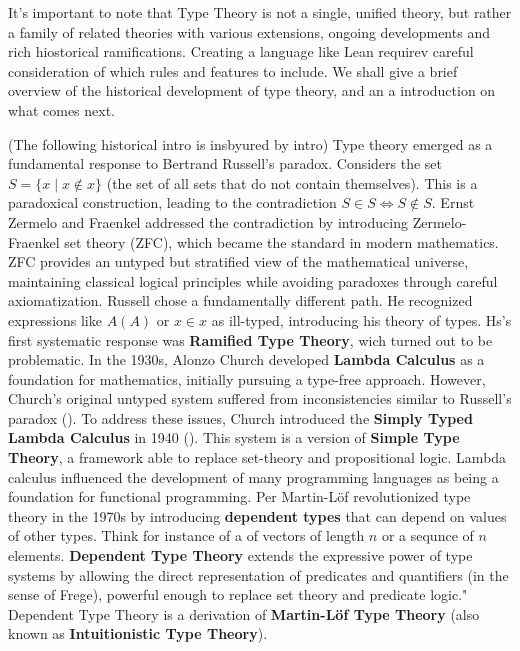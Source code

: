 It's important to note that Type Theory is not a single, unified theory, but rather a family of 
related theories with various extensions, ongoing developments and rich hiostorical ramifications. 
Creating a language like Lean requirev careful consideration of which rules and features to include.
We shall give a brief overview of the historical development of type theory, and an a introduction on 
what comes next.

(The following historical intro is insbyured by \cite{carneiro2019typetheorylean} intro)
Type theory emerged as a fundamental response to Bertrand Russell's paradox. 
Considers the set $S = \{x \mid x \notin x\}$ 
(the set of all sets that do not contain themselves). This is a paradoxical construction, 
leading to the contradiction $S \in S \iff S \notin S$. 
Ernst Zermelo and Fraenkel addressed the contradiction by introducing Zermelo-Fraenkel set theory (ZFC), 
which became the standard in modern mathematics. 
ZFC provides an untyped but stratified view of the mathematical universe, 
maintaining classical logical principles while avoiding paradoxes through careful axiomatization.
Russell chose a fundamentally different path. He recognized expressions 
like $A(A)$ or $x \in x$ as ill-typed, introducing his theory of types.
Hs's first systematic response was \textbf{Ramified Type Theory}, wich turned out to be problematic.
In the 1930s, Alonzo Church developed \textbf{Lambda Calculus} as a foundation for mathematics, 
initially pursuing a type-free approach. However, Church's original untyped system suffered from 
inconsistencies similar to Russell's paradox (\cite{wadler2015propositions}). To address these issues, 
Church introduced the \textbf{Simply Typed Lambda Calculus} in 1940 (\cite{church1940formulation}).  
This system is a version of \textbf{Simple Type Theory}, a framework able to replace 
set-theory and propositional logic.
Lambda calculus influenced the development of many programming languages as being a foundation for
functional programming.
Per Martin-L\"{o}f revolutionized type theory in the 1970s by introducing 
\textbf{dependent types} that can depend on values of other types.
Think for instance of a of vectors of length $n$ or a sequnce of $n$ elements.
\textbf{Dependent Type Theory} extends the expressive power of type systems by allowing the direct representation
 of predicates and quantifiers (in the sense of Frege),  powerful enough to replace set theory and predicate logic."
Dependent Type Theory is a derivation of \textbf{Martin-L\"{o}f Type Theory} 
(also known as \textbf{Intuitionistic Type Theory}).
